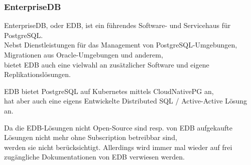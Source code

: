 
\begin{flushleft}
    \subsubsection{EnterpriseDB}
    EnterpriseDB, oder EDB, ist ein führendes Software- und Servicehaus für PostgreSQL\cite{UIY9LXTF}.\\
    Nebst Dienstleistungen für das Management von PostgreSQL-Umgebungen, Migrationen aus Oracle-Umgebungen und anderem,\\
    bietet EDB auch eine vielwahl an zusätzlicher Software und eigene Replikationslösungen.\\
\end{flushleft}
\begin{flushleft}
    EDB bietet PostgreSQL auf Kubernetes mittels CloudNativePG an,\\
    hat aber auch eine eigens Entwickelte Distributed SQL / Active-Active Lösung an.
\end{flushleft}
\begin{flushleft}
    Da die EDB-Lösungen nicht Open-Source sind resp. von EDB aufgekaufte Lösungen nicht mehr ohne Subscription betreibbar sind,\\
    werden sie nicht berücksichtigt.
    Allerdings wird immer mal wieder auf frei zugängliche Dokumentationen von EDB verwiesen werden.
\end{flushleft}